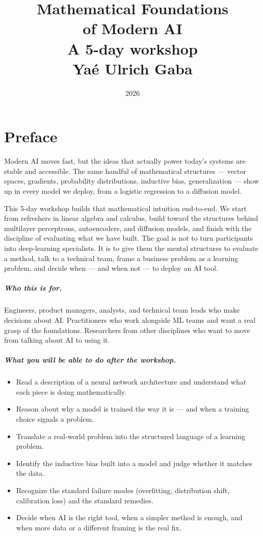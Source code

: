 \documentclass[12pt,a4paper,twoside]{book}
\title{
  \vspace{-2cm}
  {\Huge\bfseries Mathematical Foundations}\\[6pt]
  {\Huge\bfseries of Modern AI}\\[12pt]
  {\LARGE A 5-day workshop}\\[24pt]
  {\normalsize Yaé Ulrich Gaba}
}
\date{2026}
\author{}
\begin{document}
\frontmatter
\maketitle

\tableofcontents
\newpage

\chapter*{Preface}

Modern AI moves fast, but the ideas that actually power today's systems are stable and accessible. The same handful of mathematical structures --- vector spaces, gradients, probability distributions, inductive bias, generalization --- show up in every model we deploy, from a logistic regression to a diffusion model.

This 5-day workshop builds that mathematical intuition end-to-end. We start from refreshers in linear algebra and calculus, build toward the structures behind multilayer perceptrons, autoencoders, and diffusion models, and finish with the discipline of evaluating what we have built. The goal is not to turn participants into deep-learning specialists. It is to give them the mental structures to evaluate a method, talk to a technical team, frame a business problem as a learning problem, and decide when --- and when not --- to deploy an AI tool.

\paragraph{Who this is for.} Engineers, product managers, analysts, and technical team leads who make decisions about AI. Practitioners who work alongside ML teams and want a real grasp of the foundations. Researchers from other disciplines who want to move from talking about AI to using it.

\paragraph{What you will be able to do after the workshop.}
\begin{itemize}
  \item Read a description of a neural network architecture and understand what each piece is doing mathematically.
  \item Reason about why a model is trained the way it is --- and when a training choice signals a problem.
  \item Translate a real-world problem into the structured language of a learning problem.
  \item Identify the inductive bias built into a model and judge whether it matches the data.
  \item Recognize the standard failure modes (overfitting, distribution shift, calibration loss) and the standard remedies.
  \item Decide when AI is the right tool, when a simpler method is enough, and when more data or a different framing is the real fix.
\end{itemize}
\end{document}
